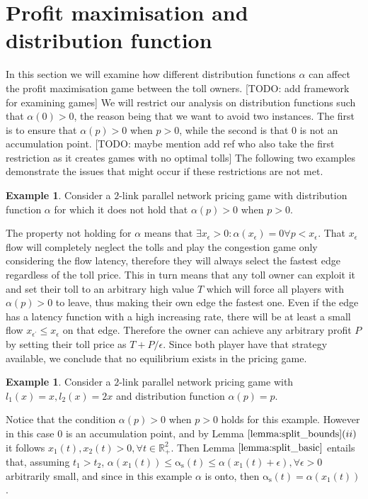 \documentclass[10pt,a4paper]{book}
\newcommand{\as}{\mathrm{\alpha_s}}
\newcommand{\R}{\mathbb{R}}
\theoremstyle{definition}
\theoremstyle{comment}
\newtheorem{example}[definition]{Example}
\begin{document}
\section{Profit maximisation and distribution function}

In this section we will examine how different distribution functions $\alpha$ can affect the profit maximisation game between the toll owners.
[TODO: add framework for examining games]
We will restrict our analysis on distribution functions such that $\alpha(0) > 0$, the reason being that we want to avoid two instances.
The first is to ensure that $\alpha(p) > 0$ when $p > 0$, while the second is that $0$ is not an accumulation point.
[TODO: maybe mention add ref who also take the first restriction as it creates games with no optimal tolls]
The following two examples demonstrate the issues that might occur if these restrictions are not met.

\begin{example}
	Consider a $2$-link parallel network pricing game with distribution function $\alpha$ for which it does not hold that $\alpha(p) > 0$ when $p > 0$.
\end{example}

The property not holding for $\alpha$ means that $\exists x_\epsilon > 0 : \alpha(x_\epsilon) = 0 \forall p < x_\epsilon$.
That $x_\epsilon$ flow will completely neglect the tolls and play the congestion game only considering the flow latency, therefore they will always select the fastest edge regardless of the toll price.
This in turn means that any toll owner can exploit it and set their toll to an arbitrary high value $T$ which will force all players with $\alpha(p) > 0$ to leave, thus making their own edge the fastest one.
Even if the edge has a latency function with a high increasing rate, there will be at least a small flow $x_{\epsilon^\prime} \le x_\epsilon$ on that edge.
Therefore the owner can achieve any arbitrary profit $P$ by setting their toll price as $T + P/\epsilon$.
Since both player have that strategy available, we conclude that no equilibrium exists in the pricing game.

\begin{example}
	\label{example:a_0_ap}
	Consider a $2$-link parallel network pricing game with $l_1(x) = x, l_2(x) = 2x$ and distribution function $\alpha(p) = p$.
\end{example}

Notice that the condition $\alpha(p) > 0$ when $p > 0$ holds for this example.
However in this case $0$ is an accumulation point, and by Lemma $\ref{lemma:split_bounds}(ii)$ it follows $x_1(t), x_2(t) > 0, \forall t \in \R_+^2$.
Then Lemma $\ref{lemma:split_basic}$ entails that, assuming $t_1 > t_2$, $\alpha(x_1(t)) \le \as(t) \le \alpha(x_1(t) + \epsilon), \forall \epsilon > 0$ arbitrarily small, and since in this example $\alpha$ is onto, then $\as(t) = \alpha(x_1(t))$.
\end{document}
